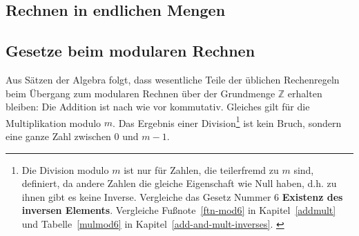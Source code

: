 \begin{refsegment}
\newpage
\section{Rechnen in endlichen Mengen}

\subsection{Gesetze beim modularen Rechnen}
\label{Laws-modular-calcs}

Aus Sätzen der Algebra folgt, dass wesentliche Teile der üblichen
Rechenregeln beim Übergang zum modularen Rechnen über der Grundmenge
$\mathbb{Z}$ erhalten bleiben: Die Addition ist nach wie vor kommutativ.
Gleiches gilt für die Multiplikation modulo $m$. Das Ergebnis einer
Division\footnote{%
Die Division modulo $m$ ist nur für Zahlen, die
teilerfremd zu $m$ sind, definiert, da
andere Zahlen die gleiche Eigenschaft wie Null haben, d.h. zu ihnen gibt es
keine Inverse.
Vergleiche das Gesetz Nummer 6 {\bf Existenz des inversen Elements}.
Vergleiche Fußnote~\ref{ftn-mod6} in Kapitel~\ref{addmult} und
Tabelle~\ref{mulmod6} in Kapitel~\ref{add-and-mult-inverses}.
\label{ftn-res-divmodn}\label{ftn-zth-divmodn}
} ist kein Bruch, sondern eine ganze Zahl zwischen $0$ und $m-1$.


\end{refsegment}
